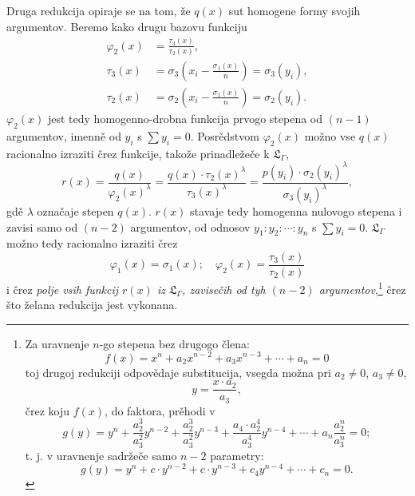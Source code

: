 \documentclass[11pt]{article}
\begin{document}
Druga redukcija opiraje se na tom, že $q(x)$ sut homogene formy svojih argumentov. Beremo kako drugu bazovu funkciju
\[
\begin{aligned}
\varphi_2(x)&=\frac{\tau_3(x)}{\tau_2(x)},\\
\tau_3(x)&=\sigma_3\left(x_i-\frac{\sigma_1(x)}{n}\right)=\sigma_3(y_i),\\
\tau_2(x)&=\sigma_2\left(x_i-\frac{\sigma_1(x)}{n}\right)=\sigma_2(y_i).
\end{aligned}
\]
$\varphi_2(x)$ jest tedy homogenno-drobna funkcija prvogo stepena od $(n-1)$ argumentov, imenně od $y_i$ s $\sum y_i=0$. Posrědstvom $\varphi_2(x)$ možno vse $q(x)$ racionalno izraziti črez funkcije, takože prinadležeče k $\mathfrak L_\Gamma$,
\[
r(x)=\frac{q(x)}{\varphi_2(x)^\lambda}=\frac{q(x)\cdot\tau_2(x)^\lambda}{\tau_3(x)^\lambda}=\frac{p(y_i)\cdot\sigma_2(y_i)^\lambda}{\sigma_3(y_i)^\lambda},
\]
gdě $\lambda$ označaje stepen $q(x)$. $r(x)$ stavaje tedy homogenna nulovogo stepena i zavisi samo od $(n-2)$ argumentov, od odnosov $y_1:y_2:\cdots:y_n$ s $\sum y_i=0$. $\mathfrak L_\Gamma$ možno tedy racionalno izraziti črez
\[
\varphi_1(x)=\sigma_1(x);\quad \varphi_2(x)=\frac{\tau_3(x)}{\tau_2(x)}
\]
i črez {\itshape polje vsih funkcij $r(x)$ iz $\mathfrak L_\Gamma$, zavisečih od tyh $(n-2)$ argumentov},\footnote{Za uravnenje $n$-go stepena bez drugogo člena:
\[
f(x)=x^n+a_2x^{n-2}+a_3x^{n-3}+\cdots+a_n=0
\]
toj drugoj redukciji odpovědaje substitucija, vsegda možna pri $a_2\neq0$, $a_3\neq0$,
\[
y=\frac{x\cdot a_2}{a_3},
\]
črez koju $f(x)$, do faktora, prěhodi v
\[
g(y)=y^n+\frac{a_2^3}{a_3^2}y^{n-2}+\frac{a_2^3}{a_3^2}y^{n-3}+\frac{a_4\cdot a_2^4}{a_3^4}y^{n-4}+\cdots+a_n\frac{a_2^n}{a_3^n}=0;
\]
t. j. v uravnenje sadržeče samo $n-2$ parametry:
\[
g(y)=y^n+c\cdot y^{n-2}+c\cdot y^{n-3}+c_4y^{n-4}+\cdots+c_n=0.
\]} črez što želana redukcija jest vykonana.
\end{document}
